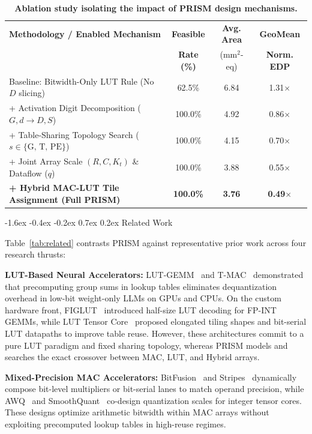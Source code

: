 \documentclass[10pt,letterpaper,twocolumn]{article}
\makeatletter
\renewcommand\section{\@startsection {section}{1}{\z@}%
  {-1.6ex \@plus -0.4ex \@minus -0.2ex}%
  {0.7ex \@plus 0.2ex}%
  {\normalfont\large\bfseries\color{primary}}}
\makeatother
\begin{document}
\begin{table}[t]
  \centering
  \caption{\textbf{Ablation study isolating the impact of PRISM design mechanisms.}}
  \label{tab:ablation}
  \footnotesize
  \setlength{\tabcolsep}{3.0pt}
  \begin{tabularx}{\columnwidth}{Xccc}
    \toprule
    \textbf{Methodology / Enabled Mechanism} & \textbf{Feasible} & \textbf{Avg. Area} & \textbf{GeoMean} \\
    & \textbf{Rate (\%)} & ($\text{mm}^2$-eq) & \textbf{Norm. EDP} \\
    \midrule
    Baseline: Bitwidth-Only LUT Rule (No $D$ slicing) & 62.5\% & 6.84 & 1.31$\times$ \\
    + Activation Digit Decomposition ($G, d \to D, S$) & 100.0\% & 4.92 & 0.86$\times$ \\
    + Table-Sharing Topology Search ($s \in \{\text{G, T, PE}\}$) & 100.0\% & 4.15 & 0.70$\times$ \\
    + Joint Array Scale $(R,C,K_t)$ \& Dataflow ($q$) & 100.0\% & 3.88 & 0.55$\times$ \\
    \textbf{+ Hybrid MAC-LUT Tile Assignment (Full PRISM)} & \textbf{100.0\%} & \textbf{3.76} & \textbf{0.49$\times$} \\
    \bottomrule
  \end{tabularx}
\end{table}

\section{Related Work}

Table~\ref{tab:related} contrasts PRISM against representative prior work across four research thrusts:

\textbf{LUT-Based Neural Accelerators:} LUT-GEMM~\cite{park2024lutgemm} and T-MAC~\cite{wei2024tmac} demonstrated that precomputing group sums in lookup tables eliminates dequantization overhead in low-bit weight-only LLMs on GPUs and CPUs. On the custom hardware front, FIGLUT~\cite{park2025figlut} introduced half-size LUT decoding for FP-INT GEMMs, while LUT Tensor Core~\cite{mo2025luttensorcore} proposed elongated tiling shapes and bit-serial LUT datapaths to improve table reuse. However, these architectures commit to a pure LUT paradigm and fixed sharing topology, whereas PRISM models and searches the exact crossover between MAC, LUT, and Hybrid arrays.

\textbf{Mixed-Precision MAC Accelerators:} BitFusion~\cite{sharma2018bitfusion} and Stripes~\cite{judd2016stripes} dynamically compose bit-level multipliers or bit-serial lanes to match operand precision, while AWQ~\cite{lin2024awq} and SmoothQuant~\cite{xiao2023smoothquant} co-design quantization scales for integer tensor cores. These designs optimize arithmetic bitwidth within MAC arrays without exploiting precomputed lookup tables in high-reuse regimes.
\end{document}
